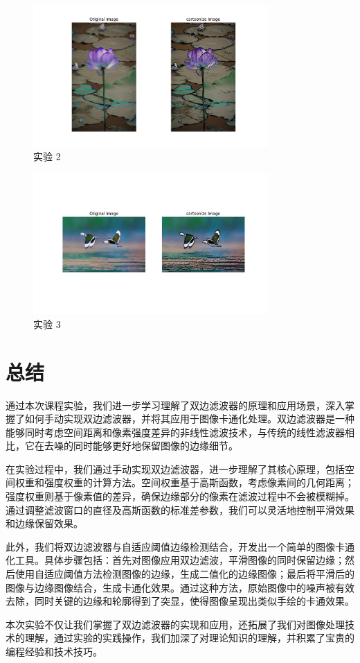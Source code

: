 \documentclass[a4paper,12pt]{report}
\begin{document}
\begin{figure}[H]
    \centering
    \includegraphics[width=0.8\textwidth]{figure/res_2.png}
    \caption{实验 2}
    \label{fig:login}
\end{figure}

\begin{figure}[H]
    \centering
    \includegraphics[width=0.8\textwidth]{figure/res_3.png}
    \caption{实验 3}
    \label{fig:login}
\end{figure}


\section{总结}
通过本次课程实验，我们进一步学习理解了双边滤波器的原理和应用场景，深入掌握了如何手动实现双边滤波器，并将其应用于图像卡通化处理。双边滤波器是一种能够同时考虑空间距离和像素强度差异的非线性滤波技术，与传统的线性滤波器相比，它在去噪的同时能够更好地保留图像的边缘细节。

在实验过程中，我们通过手动实现双边滤波器，进一步理解了其核心原理，包括空间权重和强度权重的计算方法。空间权重基于高斯函数，考虑像素间的几何距离；强度权重则基于像素值的差异，确保边缘部分的像素在滤波过程中不会被模糊掉。通过调整滤波窗口的直径及高斯函数的标准差参数，我们可以灵活地控制平滑效果和边缘保留效果。

此外，我们将双边滤波器与自适应阈值边缘检测结合，开发出一个简单的图像卡通化工具。具体步骤包括：首先对图像应用双边滤波，平滑图像的同时保留边缘；然后使用自适应阈值方法检测图像的边缘，生成二值化的边缘图像；最后将平滑后的图像与边缘图像结合，生成卡通化效果。通过这种方法，原始图像中的噪声被有效去除，同时关键的边缘和轮廓得到了突显，使得图像呈现出类似手绘的卡通效果。

本次实验不仅让我们掌握了双边滤波器的实现和应用，还拓展了我们对图像处理技术的理解，通过实验的实践操作，我们加深了对理论知识的理解，并积累了宝贵的编程经验和技术技巧。

		
\end{document}
